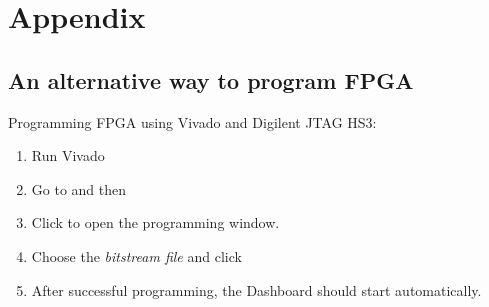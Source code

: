 \documentclass[12pt,oneside,a4]{article}
\begin{document}
\section{Appendix}
\subsection{An alternative way to program FPGA}
Programming FPGA using Vivado and Digilent JTAG HS3:
\begin{enumerate}
		\item Run Vivado
		\item Go to  and then  
		\item Click  to open the programming window.
		\item Choose the \textit{bitstream file} and click 

	\item After successful programming, the Dashboard should start automatically.
\end{enumerate}
\end{document}
